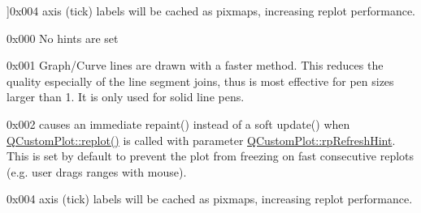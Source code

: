 \begin{Desc}
\begin{description}
{}]{\ttfamily 0x004} axis (tick) labels will be cached as pixmaps, increasing replot performance. \item[{\em 
ph\+None\hypertarget{namespace_q_c_p_a5400e5fcb9528d92002ddb938c1f4ef4a6a4b80cab7683c4533cb04b27a862fe1}{}\label{namespace_q_c_p_a5400e5fcb9528d92002ddb938c1f4ef4a6a4b80cab7683c4533cb04b27a862fe1}
}]{\ttfamily 0x000} No hints are set \item[{\em 
ph\+Fast\+Polylines\hypertarget{namespace_q_c_p_a5400e5fcb9528d92002ddb938c1f4ef4a016e00979e96542daa49cc14c976dd02}{}\label{namespace_q_c_p_a5400e5fcb9528d92002ddb938c1f4ef4a016e00979e96542daa49cc14c976dd02}
}]{\ttfamily 0x001} Graph/\+Curve lines are drawn with a faster method. This reduces the quality especially of the line segment joins, thus is most effective for pen sizes larger than 1. It is only used for solid line pens. \item[{\em 
ph\+Immediate\+Refresh\hypertarget{namespace_q_c_p_a5400e5fcb9528d92002ddb938c1f4ef4acf4738ba3f53c15dd1ad297f512b813e}{}\label{namespace_q_c_p_a5400e5fcb9528d92002ddb938c1f4ef4acf4738ba3f53c15dd1ad297f512b813e}
}]{\ttfamily 0x002} causes an immediate repaint() instead of a soft update() when \hyperlink{class_q_custom_plot_aa4bfe7d70dbe67e81d877819b75ab9af}{Q\+Custom\+Plot\+::replot()} is called with parameter \hyperlink{class_q_custom_plot_a45d61392d13042e712a956d27762aa39a5349b4ed6366760e34653bc54613a5ad}{Q\+Custom\+Plot\+::rp\+Refresh\+Hint}. This is set by default to prevent the plot from freezing on fast consecutive replots (e.\+g. user drags ranges with mouse). \item[{\em 
ph\+Cache\+Labels\hypertarget{namespace_q_c_p_a5400e5fcb9528d92002ddb938c1f4ef4a3165c7c7d350a5a5813a4105067e2f37}{}\label{namespace_q_c_p_a5400e5fcb9528d92002ddb938c1f4ef4a3165c7c7d350a5a5813a4105067e2f37}
}]{\ttfamily 0x004} axis (tick) labels will be cached as pixmaps, increasing replot performance. \end{description}
\end{Desc}
